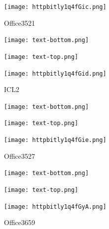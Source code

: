 \documentclass[letterpaper]{article}
\begin{document}
 \begingroup 
 \centerline{\texttt{[image: httpbitly1q4fGic.png]}} 
 \endgroup 
 \vspace*{\fill} 

 \hfill{\small Office3521} 

  \vspace{0.7in} 
 
 \centerline{\texttt{[image: text-bottom.png]}} 
 
 \pagebreak 
{} 
 \vspace*{\fill} 
 
  \centerline{\texttt{[image: text-top.png]}} 
 
 \vspace{0.5in} 
 
 \begingroup 
 \centerline{\texttt{[image: httpbitly1q4fGid.png]}} 
 \endgroup 
 \vspace*{\fill} 

 \hfill{\small ICL2} 

  \vspace{0.7in} 
 
 \centerline{\texttt{[image: text-bottom.png]}} 
 
 \pagebreak 
{} 
 \vspace*{\fill} 
 
  \centerline{\texttt{[image: text-top.png]}} 
 
 \vspace{0.5in} 
 
 \begingroup 
 \centerline{\texttt{[image: httpbitly1q4fGie.png]}} 
 \endgroup 
 \vspace*{\fill} 

 \hfill{\small Office3527} 

  \vspace{0.7in} 
 
 \centerline{\texttt{[image: text-bottom.png]}} 
 
 \pagebreak 
{} 
 \vspace*{\fill} 
 
  \centerline{\texttt{[image: text-top.png]}} 
 
 \vspace{0.5in} 
 
 \begingroup 
 \centerline{\texttt{[image: httpbitly1q4fGyA.png]}} 
 \endgroup 
 \vspace*{\fill} 

 \hfill{\small Office3659} 

  \vspace{0.7in} 
 
\end{document}
